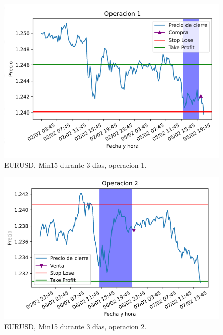\begin{figure}[h]
	\includegraphics[width=1\textwidth]{imagenes/pruebas/EURUSD/min15_3dias.png}	
	\caption{EURUSD, Min15 durante 3 días, operacion 1.}
\end{figure}

\begin{figure}[h]
	\includegraphics[width=1\textwidth]{imagenes/pruebas/EURUSD/min15_3dias_2.png}	
	\caption{EURUSD, Min15 durante 3 días, operacion 2.}
\end{figure}

